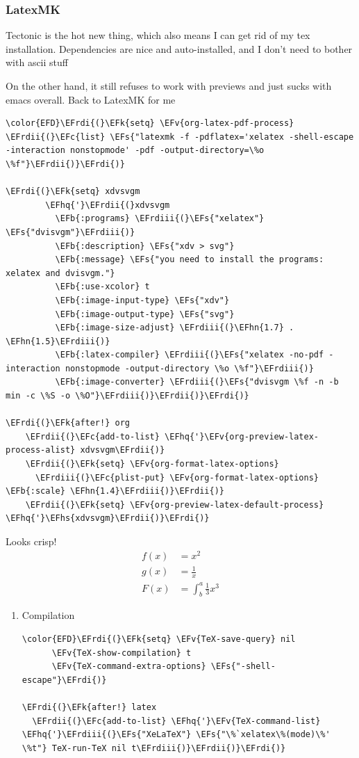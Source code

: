 \documentclass{scrartcl}
\newcommand{\EFk}[1]{\textcolor{EFk}{#1}} %
\newcommand{\EFs}[1]{\textcolor{EFs}{#1}} %
\newcommand{\EFb}[1]{\textcolor{EFb}{#1}} %
\newcommand{\EFc}[1]{\textcolor{EFc}{#1}} %
\newcommand{\EFv}[1]{\textcolor{EFv}{#1}} %
\newcommand{\EFhn}[1]{#1} %
\newcommand{\EFhq}[1]{#1} %
\newcommand{\EFhs}[1]{#1} %
\newcommand{\EFrdi}[1]{#1} %
\newcommand{\EFrdii}[1]{#1} %
\newcommand{\EFrdiii}[1]{#1} %
\begin{document}
\subsubsection{LatexMK}
\label{sec:org15fef4d}
Tectonic is the hot new thing, which also means I can get rid of my tex
installation. Dependencies are nice and auto-installed, and I don't need to
bother with ascii stuff

On the other hand, it still refuses to work with previews and just sucks with
emacs overall. Back to LatexMK for me
\begin{Code}
\begin{Verbatim}[]
\color{EFD}\EFrdi{(}\EFk{setq} \EFv{org-latex-pdf-process} \EFrdii{(}\EFc{list} \EFs{"latexmk -f -pdflatex='xelatex -shell-escape -interaction nonstopmode' -pdf -output-directory=\%o \%f"}\EFrdii{)}\EFrdi{)}

\EFrdi{(}\EFk{setq} xdvsvgm
        \EFhq{'}\EFrdii{(}xdvsvgm
          \EFb{:programs} \EFrdiii{(}\EFs{"xelatex"} \EFs{"dvisvgm"}\EFrdiii{)}
          \EFb{:description} \EFs{"xdv > svg"}
          \EFb{:message} \EFs{"you need to install the programs: xelatex and dvisvgm."}
          \EFb{:use-xcolor} t
          \EFb{:image-input-type} \EFs{"xdv"}
          \EFb{:image-output-type} \EFs{"svg"}
          \EFb{:image-size-adjust} \EFrdiii{(}\EFhn{1.7} . \EFhn{1.5}\EFrdiii{)}
          \EFb{:latex-compiler} \EFrdiii{(}\EFs{"xelatex -no-pdf -interaction nonstopmode -output-directory \%o \%f"}\EFrdiii{)}
          \EFb{:image-converter} \EFrdiii{(}\EFs{"dvisvgm \%f -n -b min -c \%S -o \%O"}\EFrdiii{)}\EFrdii{)}\EFrdi{)}

\EFrdi{(}\EFk{after!} org
    \EFrdii{(}\EFc{add-to-list} \EFhq{'}\EFv{org-preview-latex-process-alist} xdvsvgm\EFrdii{)}
    \EFrdii{(}\EFk{setq} \EFv{org-format-latex-options}
      \EFrdiii{(}\EFc{plist-put} \EFv{org-format-latex-options} \EFb{:scale} \EFhn{1.4}\EFrdiii{)}\EFrdii{)}
    \EFrdii{(}\EFk{setq} \EFv{org-preview-latex-default-process} \EFhq{'}\EFhs{xdvsvgm}\EFrdii{)}\EFrdi{)}
\end{Verbatim}
\end{Code}

Looks crisp!
\begin{align*}
  f(x) &= x^2\\
  g(x) &= \frac{1}{x}\\
  F(x) &= \int^a_b \frac{1}{3}x^3
\end{align*}

\begin{enumerate}
\item Compilation
\label{sec:orgf4360b2}
\begin{Code}
\begin{Verbatim}[]
\color{EFD}\EFrdi{(}\EFk{setq} \EFv{TeX-save-query} nil
      \EFv{TeX-show-compilation} t
      \EFv{TeX-command-extra-options} \EFs{"-shell-escape"}\EFrdi{)}

\EFrdi{(}\EFk{after!} latex
  \EFrdii{(}\EFc{add-to-list} \EFhq{'}\EFv{TeX-command-list} \EFhq{'}\EFrdiii{(}\EFs{"XeLaTeX"} \EFs{"\%`xelatex\%(mode)\%' \%t"} TeX-run-TeX nil t\EFrdiii{)}\EFrdii{)}\EFrdi{)}
\end{Verbatim}
\end{Code}
\end{enumerate}
\end{document}
